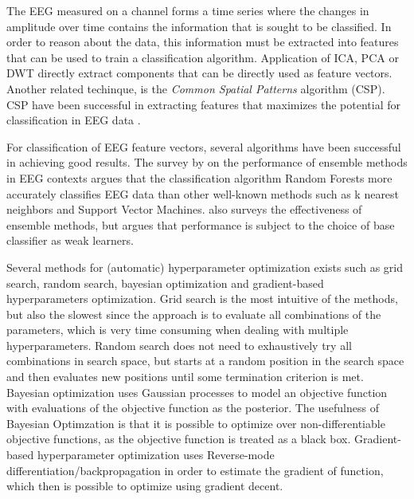 The EEG measured on a channel forms a time series where the changes in amplitude over time contains the information that is sought to be classified. In order to reason about the data, this information must be extracted into features that can be used to train a classification algorithm. Application of ICA, PCA or DWT directly extract components that can be directly used as feature vectors. Another related techinque, is the \emph{Common Spatial Patterns} algorithm (CSP). CSP have been successful in extracting features that maximizes the potential for classification in EEG data \citep{ang2008filter,ang2012filter}.

For classification of EEG feature vectors, several algorithms have been successful in achieving good results. The survey by \citet{chan2015systematic} on the performance of ensemble methods in EEG contexts argues that the classification algorithm Random Forests more accurately classifies EEG data than other well-known methods such as k nearest neighbors and Support Vector Machines. \citet{sun2007experimental} also surveys the effectiveness of ensemble methods, but argues that performance is subject to the choice of base classifier as weak learners. 

Several methods for (automatic) hyperparameter optimization exists such as grid search, random search, bayesian optimization and gradient-based hyperparameters optimization. Grid search is the most intuitive of the methods, but also the slowest since the approach is to evaluate all combinations of the parameters, which is very time consuming when dealing with multiple hyperparameters. Random search does not need to exhaustively try all combinations in search space, but starts at a random position in the search space and then evaluates new positions until some termination criterion is met. Bayesian optimization uses Gaussian processes to model an objective function with evaluations of the objective function as the posterior. The usefulness of Bayesian Optimzation is that it is possible to optimize over non-differentiable objective functions, as the objective function is treated as a black box. Gradient-based hyperparameter optimization uses Reverse-mode differentiation/backpropagation in order to estimate the gradient of function, which then is possible to optimize using gradient decent.

